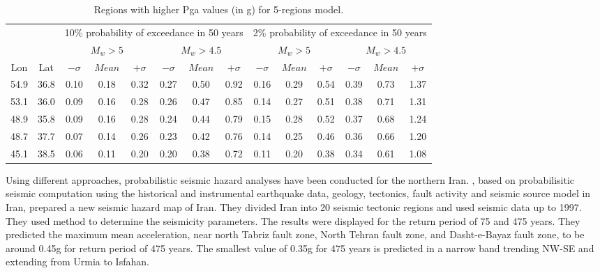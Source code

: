 \begin{table*}[!ht]
\centering
\caption{ Regions with higher Pga values (in g) for 5-regions model. }
\begin{tabular}{ cccccccccccccc}


	
	& & \multicolumn{6}{c}{10\% probability of exceedance in 50 years} & \multicolumn{6}{c}{2\% probability of exceedance in 50 years}    \\ 
	\cline{3-14}   & & \multicolumn{3}{c}{ $M_w > 5$ } & \multicolumn{3}{c}{ $M_w > 4.5$} & \multicolumn{3}{c}{ $M_w > 5$ } & \multicolumn{3}{c}{ $M_w > 4.5$ } \\ 
	\cline{3-14}    Lon & Lat & $-\sigma $ & $Mean$ & $+\sigma$ & $-\sigma $& $Mean$ &$+\sigma$& $-\sigma $ & $Mean$ & $+\sigma$& $-\sigma $ & $Mean$ & $+\sigma$ \\ \hline
	54.9	&	36.8	&	0.10	&	0.18	&	0.32	&	0.27	&	0.50	&	0.92	&	0.16	&	0.29	&	0.54	&	0.39	&	0.73	&	1.37 \\ \hline
	53.1	&	36.0 	&	0.09	&	0.16	&	0.28	&	0.26	&	0.47	&	0.85	&	0.14	&	0.27	&	0.51	&	0.38	&	0.71	&	1.31 \\ \hline
	48.9	&	35.8	&	0.09	&	0.16	&	0.28	&	0.24	&	0.44	&	0.79	&	0.15	&	0.28	&	0.52	&	0.37	&	0.68	&	1.24 \\ \hline
	48.7	&	37.7	&	0.07	&	0.14	&	0.26	&	0.23	&	0.42	&	0.76	&	0.14	&	0.25	&	0.46	&	0.36	&	0.66	&	1.20 \\ \hline
	45.1	&	38.5	&	0.06	&	0.11	&	0.20	&	0.20	&	0.38	&	0.72	&	0.11	&	0.20	&	0.38	&	0.34	&	0.61	&	1.08 \\ \hline
	 
\end{tabular}
\label{tab:pga_values_models}
\end{table*}








\noindent
Using different approaches, probabilistic seismic hazard analyses have been conducted for the northern Iran.
\citet{Tavakoli1999}, based on probabilisitic seismic computation using the historical and instrumental earthquake data, geology, tectonics, fault activity and seismic source model in Iran, prepared a new seismic hazard map of Iran. They divided Iran into 20 seismic tectonic regions and used seismic data up to 1997. They used \citet{Kijko1992} method  to determine the seismicity parameters.
The results were displayed for the return period of 75 and 475 years. They predicted the maximum mean acceleration, near north Tabriz fault zone, North Tehran fault zone, and Dasht-e-Bayaz fault zone, to be around 0.45g for return period of 475 years. The smallest value of 0.35g for 475 years is predicted in a narrow band trending NW-SE and extending from Urmia to Isfahan.  


